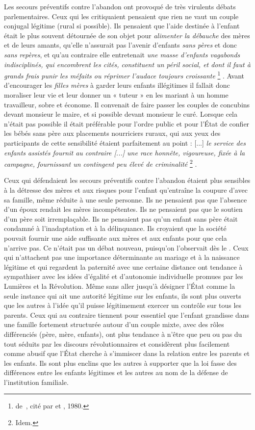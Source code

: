  Les secours préventifs contre l'abandon ont provoqué de très virulents débats parlementaires. Ceux qui les critiquaient pensaient que rien ne vaut un couple conjugal légitime (rural si possible). Ils pensaient que l'aide destinée à l'enfant était le plus souvent détournée de son objet pour \emph{alimenter la débauche} des mères et de leurs amants, qu'elle n'assurait pas l'avenir d'enfants \emph{sans pères} et donc \emph{sans repères}, et qu'au contraire elle entretenait \emph{une masse d'enfants vagabonds indisciplinés, qui encombrent les cités, constituent un péril social, et dont il faut à grands frais punir les méfaits ou réprimer l'audace toujours croissante}%
\footnote{de~, cité par  et , 1980.}%
. Avant d'encourager les \emph{filles mères} à garder leurs enfants illégitimes il fallait donc moraliser leur vie et leur donner un « tuteur » en les mariant à un homme travailleur, sobre et économe. Il convenait de faire passer les couples de concubins devant monsieur le maire, et si possible devant monsieur le curé. Lorsque cela n'était pas possible il était préférable pour l'ordre public et pour l'État de confier les bébés sans père aux placements nourriciers ruraux, qui aux yeux des participants de cette sensibilité étaient parfaitement au point : [...] \emph{le service des enfants assistés fournit au contraire \emph{[...]} une race honnête, vigoureuse, fixée à la campagne, fournissant un contingent peu élevé de criminalité}%
\footnote{Idem.}%
.

 Ceux qui défendaient les secours préventifs contre l'abandon étaient plus sensibles à la détresse des mères et aux risques pour l'enfant qu'entraîne la coupure d'avec sa famille, même réduite à une seule personne. Ils ne pensaient pas que l'absence d'un époux rendait les mères incompétentes. Ils ne pensaient pas que le soutien d'un père soit irremplaçable. Ils ne pensaient pas qu'un enfant sans père était condamné à l'inadaptation et à la délinquance. Ils croyaient que la société pouvait fournir une aide suffisante aux mères et aux enfants pour que cela n'arrive pas. Ce n'était pas un débat nouveau, puisqu'on l'observait dès le . Ceux qui n'attachent pas une importance déterminante au mariage et à la naissance légitime et qui regardent la paternité avec une certaine distance ont tendance à sympathiser avec les idées d'égalité et d'autonomie individuelle promues par les Lumières et la Révolution. Même sans aller jusqu'à désigner l'État comme la seule instance qui ait une autorité légitime sur les enfants, ils sont plus ouverts que les autres à l'idée qu'il puisse légitimement exercer un contrôle sur tous les parents. Ceux qui au contraire tiennent pour essentiel que l'enfant grandisse dans une famille fortement structurée autour d'un couple mixte, avec des rôles différenciés (père, mère, enfants), ont plus tendance à n'être que peu ou pas du tout séduits par les discours révolutionnaires et considèrent plus facilement comme abusif que l'État cherche à s'immiscer dans la relation entre les parents et les enfants. Ils sont plus enclins que les autres à supporter que la loi fasse des différences entre les enfants légitimes et les autres au nom de la défense de l'institution familiale. 
 
 
 
 

